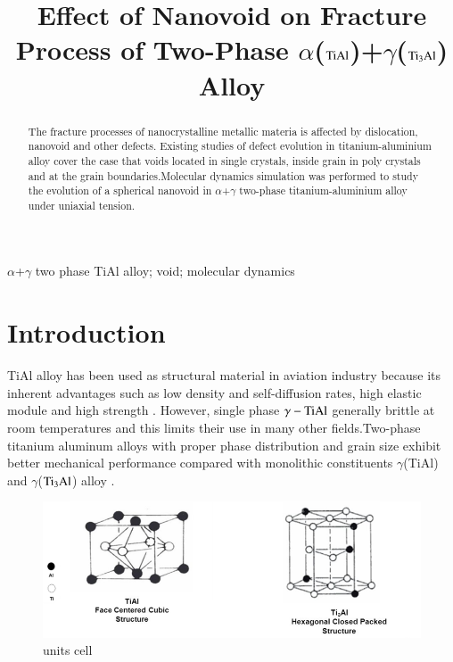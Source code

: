 \documentclass[final,5p,times,twocolumn]{elsarticle}
\begin{document}
\begin{frontmatter}
\title{Effect of Nanovoid on Fracture Process of Two-Phase $\alpha$($\rm TiAl$)+$\gamma$($\rm Ti_3Al$) Alloy}

\address[mymainaddress]{School of Mechanical and Electronical Engineering, Lanzhou University of Technology. Lanzhou 730050, China}
\begin{abstract}
 The fracture processes of nanocrystalline metallic materia is affected by dislocation, nanovoid and other defects. Existing studies of defect evolution in titanium-aluminium alloy cover the case that voids located in single crystals, inside grain in poly crystals and at the grain boundaries.Molecular dynamics simulation was performed to study the evolution of a spherical nanovoid in $\alpha$+$\gamma$ two-phase titanium-aluminium alloy under uniaxial tension.
\end{abstract}
\begin{keyword}
$\alpha$+$\gamma$ two phase TiAl alloy; void; molecular dynamics
\end{keyword}
\end{frontmatter}
\linenumbers

\section{Introduction}
TiAl alloy has been used as structural material in aviation industry because its inherent advantages such as low density and self-diffusion rates, high elastic module and high strength \cite{Xiong2015}. However, single phase $\gamma-\rm TiAl$ generally brittle at room temperatures and this limits their use in many other fields.Two-phase titanium aluminum alloys with proper phase distribution and grain size exhibit better mechanical performance compared with monolithic constituents $\gamma$(TiAl) and $\gamma$($\rm Ti_3Al$) alloy \cite{intro-structure}.
\begin{figure}
	\centering
	\includegraphics[width=1\linewidth]{img/cell}
	\caption{units cell}
\end{figure}
\end{document}
